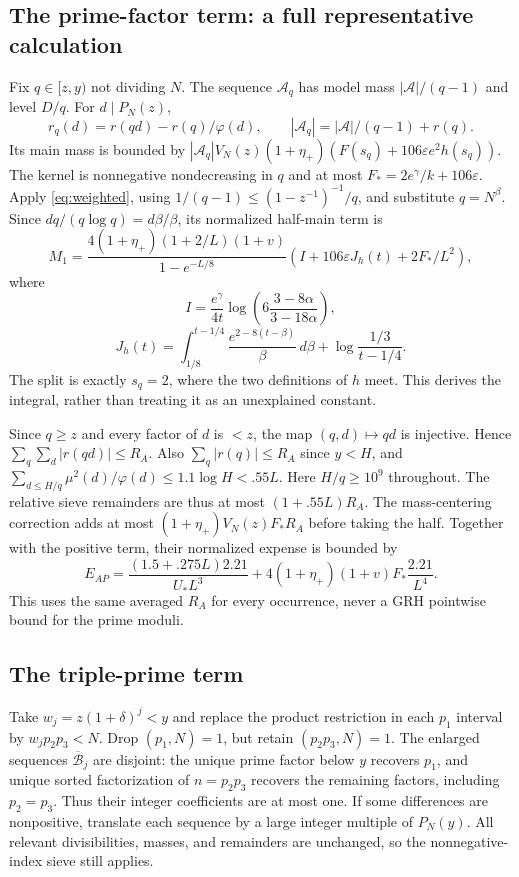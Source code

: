 \documentclass[11pt]{article}
\theoremstyle{remark}\newtheorem{remark}[theorem]{Remark}
\newcommand{\A}{\mathcal A}
\newcommand{\B}{\mathcal B}
\newcommand{\eps}{\varepsilon}
\begin{document}
\subsection{The prime-factor term: a full representative calculation}
Fix $q\in[z,y)$ not dividing $N$. The sequence $\A_q$ has model
mass $|\A|/(q-1)$ and level $D/q$. For $d\mid P_N(z)$,
\[
r_q(d)=r(qd)-r(q)/\varphi(d),\qquad
|\A_q|=|\A|/(q-1)+r(q).
\]
Its main mass is bounded by
$|\A_q|V_N(z)(1+\eta_+)(F(s_q)+106\eps e^2h(s_q))$.
The kernel is nonnegative nondecreasing in $q$ and at most
$F_*=2e^\gamma/k+106\eps$.
Apply \eqref{eq:weighted}, using
$1/(q-1)\le(1-z^{-1})^{-1}/q$, and substitute $q=N^\beta$.
Since $dq/(q\log q)=d\beta/\beta$, its normalized half-main term is
\begin{equation}\label{eq:M1}
M_1=\frac{4(1+\eta_+)(1+2/L)(1+v)}{1-e^{-L/8}}
\left(I+106\eps J_h(t)+2F_*/L^2\right),
\end{equation}
where
\[
I=\frac{e^\gamma}{4t}\log\left(6\frac{3-8\alpha}{3-18\alpha}\right),
\]
\[
J_h(t)=\int_{1/8}^{t-1/4}\frac{e^{2-8(t-\beta)}}\beta\,d\beta
+\log\frac{1/3}{t-1/4}.
\]
The split is exactly $s_q=2$, where the two definitions of $h$ meet.
This derives the integral, rather than treating it as an unexplained constant.

Since $q\ge z$ and every factor of $d$ is $<z$, the map $(q,d)\mapsto qd$
is injective. Hence $\sum_q\sum_d|r(qd)|\le R_A$.
Also $\sum_q|r(q)|\le R_A$ since $y<H$, and
$\sum_{d\le H/q}\mu^2(d)/\varphi(d)\le1.1\log H<.55L$.
Here $H/q\ge10^9$ throughout. The relative sieve remainders are thus at
most $(1+.55L)R_A$. The mass-centering correction adds at most
$(1+\eta_+)V_N(z)F_*R_A$ before taking the half.
Together with the positive term, their normalized expense is bounded by
\begin{equation}\label{eq:EAP}
E_{AP}=\frac{(1.5+.275L)2.21}{U_*L^3}
+4(1+\eta_+)(1+v)F_*\frac{2.21}{L^4}.
\end{equation}
This uses the same averaged $R_A$ for every occurrence, never a GRH
pointwise bound for the prime moduli.

\subsection{The triple-prime term}
Take $w_j=z(1+\delta)^j<y$ and replace the product restriction in
each $p_1$ interval by $w_jp_2p_3<N$. Drop $(p_1,N)=1$, but retain
$(p_2p_3,N)=1$. The enlarged sequences $\overline{\B}_j$ are disjoint:
the unique prime factor below $y$ recovers $p_1$, and unique sorted
factorization of $n=p_2p_3$ recovers the remaining factors, including
$p_2=p_3$. Thus their integer coefficients are at most one.
If some differences are nonpositive, translate each sequence by a large
integer multiple of $P_N(y)$. All relevant divisibilities, masses, and
remainders are unchanged, so the nonnegative-index sieve still applies.
\end{document}
